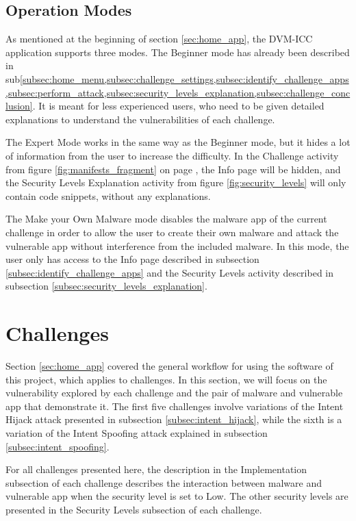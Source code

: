     \subsection{Operation Modes}
        \label{subsec:challenge_modes}
    
    As mentioned at the beginning of section \ref{sec:home_app}, the DVM-ICC application supports three modes. The Beginner mode has already been described in sub\cref{subsec:home_menu,subsec:challenge_settings,subsec:identify_challenge_apps,subsec:perform_attack,subsec:security_levels_explanation,subsec:challenge_conclusion}. It is meant for less experienced users, who need to be given detailed explanations to understand the vulnerabilities of each challenge.
    
    The Expert Mode works in the same way as the Beginner mode, but it hides a lot of information from the user to increase the difficulty. In the Challenge activity from figure \ref{fig:manifests_fragment} on page \pageref{fig:manifests_fragment}, the Info page will be hidden, and the Security Levels Explanation activity from figure \ref{fig:security_levels} will only contain code snippets, without any explanations.
    
    The Make your Own Malware mode disables the malware app of the current challenge in order to allow the user to create their own malware and attack the vulnerable app without interference from the included malware. In this mode, the user only has access to the Info page described in subsection \ref{subsec:identify_challenge_apps} and the Security Levels activity described in subsection \ref{subsec:security_levels_explanation}.
    
    \section{Challenges}
        \label{sec:challenges}
        
    Section \ref{sec:home_app} covered the general workflow for using the software of this project, which applies to challenges. In this section, we will focus on the vulnerability explored by each challenge and the pair of malware and vulnerable app that demonstrate it. The first five challenges involve variations of the Intent Hijack attack presented in subsection \ref{subsec:intent_hijack}, while the sixth is a variation of the Intent Spoofing attack explained in subsection \ref{subsec:intent_spoofing}.
    
    For all challenges presented here, the description in the Implementation subsection of each challenge describes the interaction between malware and vulnerable app when the security level is set to Low. The other security levels are presented in the Security Levels subsection of each challenge.
    
